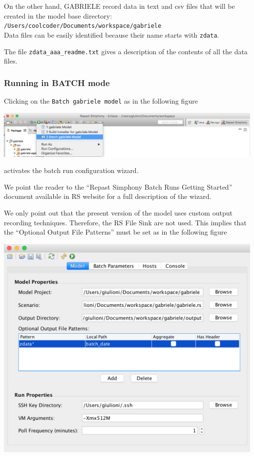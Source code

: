 \documentclass{book}
\begin{document}
\vskip2mm
On the other hand, GABRIELE record data in text and csv files that will be created in the model base directory:\\
\verb+/Users/coolcoder/Documents/workspace/gabriele+\\
Data files can be easily identified because their name starts with \verb+zdata+.

The file \verb+zdata_aaa_readme.txt+ gives a description of the contents of all the data files.

\subsubsection{Running in BATCH mode}

Clicking on the \verb+Batch gabriele model+ as in the following figure

\noindent
\includegraphics[scale=0.35]{fig_gabriele_rs_execution3}

activates the batch run configuration wizard.

We point the reader to the ``Repast Simphony Batch Runs Getting Started'' document available in RS website for a full description of the wizard.

We only point out that the present version of the model uses custom output recording techniques. Therefore, the RS File Sink are not used. This implies that the ``Optional Output File Patterns'' must be set as in the following figure

\noindent
\includegraphics[scale=0.35]{fig_gabriele_rs_batch}
\end{document}
